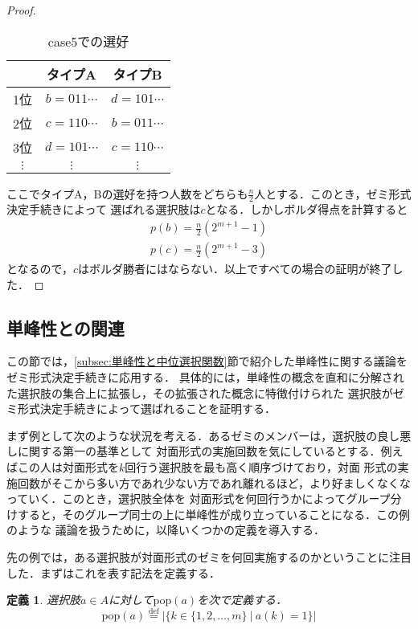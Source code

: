 \documentclass[dvipdfmx]{jsarticle}
\newtheorem{definition}{定義}
\begin{document}
\begin{proof}
  \begin{table}[h]
    \caption{case5での選好}\label{tab:case5}
    \begin{center}
      \begin{tabular}{c|c|c}\hline
          & タイプA & タイプB \\ \hline
        1位 & $b = 011\cdots$ & $d = 101\cdots$ \\
        2位 & $c = 110\cdots$ & $b = 011\cdots$ \\
        3位 & $d = 101\cdots$ & $c = 110\cdots$ \\
        $\vdots$ & $\vdots$ & $\vdots$ \\ \hline
      \end{tabular}
    \end{center}
  \end{table}

  \noindent{}ここでタイプA，Bの選好を持つ人数をどちらも$\frac{n}{2}$人とする．このとき，ゼミ形式決定手続きによって
  選ばれる選択肢は$c$となる．しかしボルダ得点を計算すると
  \begin{gather*}
    p(b) = \frac{n}{2}(2^{m+1}-1) \\
    p(c) = \frac{n}{2}(2^{m+1}-3)
  \end{gather*}
  となるので，$c$はボルダ勝者にはならない．以上ですべての場合の証明が終了した．
\end{proof}

\subsection{単峰性との関連}\label{subsec:単峰性との関連}
  この節では，\ref{subsec:単峰性と中位選択関数}節で紹介した単峰性に関する議論をゼミ形式決定手続きに応用する．
  具体的には，単峰性の概念を直和に分解された選択肢の集合上に拡張し，その拡張された概念に特徴付けられた
  選択肢がゼミ形式決定手続きによって選ばれることを証明する．

  まず例として次のような状況を考える．あるゼミのメンバーは，選択肢の良し悪しに関する第一の基準として
  対面形式の実施回数を気にしているとする．例えばこの人は対面形式を$k$回行う選択肢を最も高く順序づけており，対面
  形式の実施回数がそこから多い方であれ少ない方であれ離れるほど，より好ましくなくなっていく．このとき，選択肢全体を
  対面形式を何回行うかによってグループ分けすると，そのグループ同士の上に単峰性が成り立っていることになる．この例のような
  議論を扱うために，以降いくつかの定義を導入する．

  先の例では，ある選択肢が対面形式のゼミを何回実施するのかということに注目した．まずはこれを表す記法を定義する．
  \begin{definition}
    選択肢$a \in A$に対して$\mathrm{pop}(a)$を次で定義する．
    \[
      \mathrm{pop}(a) \stackrel{\mathrm{def}}{=} |\{k \in \{1, 2, \ldots, m \} \ | \
      a(k) = 1 \}|
    \]
  \end{definition}
\end{document}
